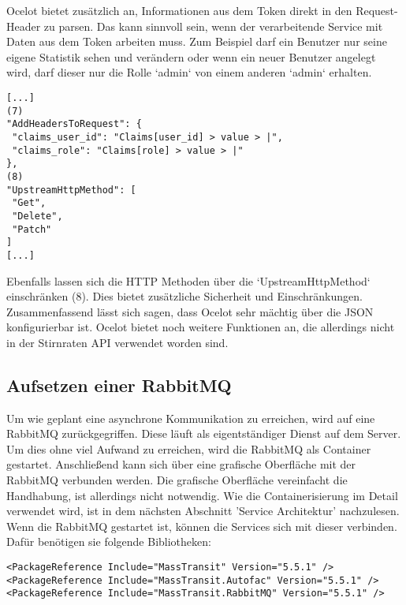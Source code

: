 Ocelot bietet zusätzlich an, Informationen aus dem Token direkt in den Request-Header zu parsen. Das kann sinnvoll sein, wenn der verarbeitende Service mit Daten aus dem Token arbeiten muss. Zum Beispiel darf ein Benutzer nur seine eigene Statistik sehen und verändern oder wenn ein neuer Benutzer angelegt wird, darf dieser nur die Rolle `admin` von einem anderen `admin` erhalten.  

\begin{verbatim}
[...]
(7)
"AddHeadersToRequest": {
 "claims_user_id": "Claims[user_id] > value > |",
 "claims_role": "Claims[role] > value > |"
},
(8)
"UpstreamHttpMethod": [
 "Get",
 "Delete",
 "Patch"
]
[...]
\end{verbatim}

Ebenfalls lassen sich die HTTP Methoden über die `UpstreamHttpMethod` einschränken (8). Dies bietet zusätzliche Sicherheit und Einschränkungen. \\

Zusammenfassend lässt sich sagen, dass Ocelot sehr mächtig über die JSON konfigurierbar ist. Ocelot bietet noch weitere Funktionen an, die allerdings nicht in der Stirnraten API verwendet worden sind.  

\subsection{Aufsetzen einer RabbitMQ}

Um wie geplant eine asynchrone Kommunikation zu erreichen, wird auf eine RabbitMQ zurückgegriffen. Diese läuft als eigentständiger Dienst auf dem Server. Um dies ohne viel Aufwand zu erreichen, wird die RabbitMQ als Container gestartet. Anschließend kann sich über eine grafische Oberfläche mit der RabbitMQ verbunden werden. Die grafische Oberfläche vereinfacht die Handhabung, ist allerdings nicht notwendig. Wie die Containerisierung im Detail verwendet wird, ist in dem nächsten Abschnitt 'Service Architektur' nachzulesen.\\

Wenn die RabbitMQ gestartet ist, können die Services sich mit dieser verbinden. Dafür benötigen sie folgende Bibliotheken:

\begin{verbatim}
<PackageReference Include="MassTransit" Version="5.5.1" />
<PackageReference Include="MassTransit.Autofac" Version="5.5.1" />
<PackageReference Include="MassTransit.RabbitMQ" Version="5.5.1" />
\end{verbatim}

